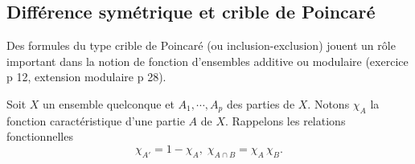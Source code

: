 \subsection{Différence symétrique et crible de Poincaré}\label{criblePoinc}
Des formules du type crible de Poincaré (ou inclusion-exclusion) jouent un rôle important dans la notion de fonction d'ensembles additive ou modulaire (exercice p 12, extension modulaire p 28).

\noindent Soit $X$ un ensemble quelconque et $A_1, \cdots, A_p$ des parties de $X$. Notons $\chi_A$ la fonction caractéristique d'une partie $A$ de $X$. Rappelons les relations fonctionnelles
\begin{displaymath}
  \chi_{A'} = 1 - \chi_A, \; \chi_{A \cap B} = \chi_A \, \chi_B.
\end{displaymath}

